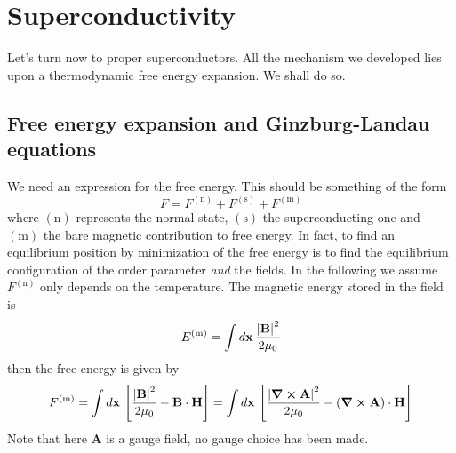 \section{Superconductivity}

Let's turn now to proper superconductors. All the mechanism we developed lies upon a thermodynamic free energy expansion. We shall do so. 

\subsection{Free energy expansion and Ginzburg-Landau equations}

We need an expression for the free energy. This should be something of the form
\[
    F = F^{(\mathrm{n})} + F^{(\mathrm{s})} + F^{(\mathrm{m})}
\]
where ${(\mathrm{n})}$ represents the normal state, ${(\mathrm{s})}$ the superconducting one and ${(\mathrm{m})}$ the bare magnetic contribution to free energy. In fact, to find an equilibrium position by minimization of the free energy is to find the equilibrium configuration of the order parameter \textit{and} the fields. In the following we assume $F^{(\mathrm{n})}$ only depends on the temperature. The magnetic energy stored in the field is
\[
    E^{(\mathrm{m})} = \int d\mathbf{x} \, \frac{\abs{\mathbf{B}}^2}{2\mu_0}
\]
then the free energy is given by
\[
    F^{(\mathrm{m})} = \int d\mathbf{x} \, \left[{ \frac{\abs{\mathbf{B}}^2}{2\mu_0} - \mathbf{B} \cdot \mathbf{H} }\right] = \int d\mathbf{x} \, \left[{ \frac{\abs{\curl\mathbf{A}}^2}{2\mu_0} - \left({ \curl\mathbf{A} }\right) \cdot \mathbf{H} }\right]
\]
Note that here $\mathbf{A}$ is a gauge field, no gauge choice has been made.

